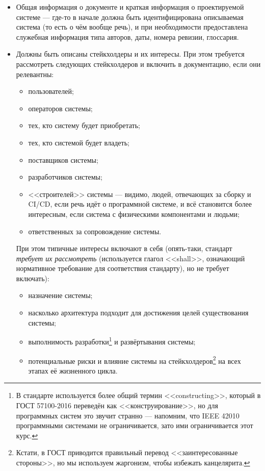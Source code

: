 \documentclass[a5paper]{article}
\begin{document}
\begin{itemize}
    \item Общая информация о документе и краткая информация о проектируемой системе --- где-то в начале должна быть идентифицирована описываемая система (то есть о чём вообще речь), и при необходимости предоставлена служебная информация типа авторов, даты, номера ревизии, глоссария.
    \item Должны быть описаны стейкхолдеры и их интересы. При этом требуется рассмотреть следующих стейкхолдеров и включить в документацию, если они релевантны:
        \begin{itemize}
            \item пользователей;
            \item операторов системы;
            \item тех, кто систему будет приобретать;
            \item тех, кто системой будет владеть;
            \item поставщиков системы;
            \item разработчиков системы;
            \item <<строителей>> системы --- видимо, людей, отвечающих за сборку и CI/CD, если речь идёт о программной системе, и всё становится более интересным, если система с физическими компонентами и людьми;
            \item ответственных за сопровождение системы.
        \end{itemize}
        При этом типичные интересы включают в себя (опять-таки, стандарт \emph{требует их рассмотреть} (используется глагол <<shall>>, означающий нормативное требование для соответствия стандарту), но не требует включать):
        \begin{itemize}
            \item назначение системы;
            \item насколько архитектура подходит для достижения целей существования системы;
            \item выполнимость разработки\footnote{В стандарте используется более общий термин <<constructing>>, который в ГОСТ 57100-2016 переведён как <<конструирование>>, но для программных систем это звучит странно --- напомним, что IEEE 42010 программными системами не ограничивается, зато ими ограничивается этот курс.} и развёртывания системы;
            \item потенциальные риски и влияние системы на стейкхолдеров\footnote{Кстати, в ГОСТ приводится правильный перевод <<заинтересованные стороны>>, но мы используем жаргонизм, чтобы избежать канцелярита.} на всех этапах её жизненного цикла.

\end{itemize}
\end{itemize}
\end{document}
